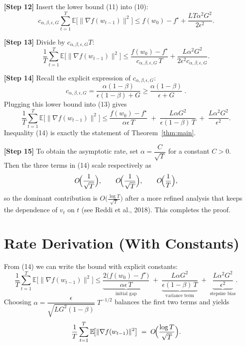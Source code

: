\documentclass{article}
\newcommand{\EE}{\mathbb{E}}
\begin{document}
\noindent\textbf{[Step 12]} Insert the lower bound (11) into (10):
\[
c_{\alpha,\beta,\epsilon,G}\sum_{t=1}^{T}\EE\!\bigl[\|\nabla f(w_{t-1})\|^{2}\bigr]
\le f(w_{0})-f^{\star}
+\frac{LT\alpha^{2}G^{2}}{2\epsilon^{2}}. \tag{12}
\]

\noindent\textbf{[Step 13]} Divide by $c_{\alpha,\beta,\epsilon,G}T$:
\[
\frac{1}{T}\sum_{t=1}^{T}\EE\!\bigl[\|\nabla f(w_{t-1})\|^{2}\bigr]
\le
\frac{f(w_{0})-f^{\star}}{c_{\alpha,\beta,\epsilon,G}\,T}
+\frac{L\alpha^{2}G^{2}}{2\epsilon^{2}c_{\alpha,\beta,\epsilon,G}}. \tag{13}
\]

\noindent\textbf{[Step 14]} Recall the explicit expression of $c_{\alpha,\beta,\epsilon,G}$:
\[
c_{\alpha,\beta,\epsilon,G}
= \frac{\alpha(1-\beta)}{\epsilon(1-\beta)+G}
\ge \frac{\alpha(1-\beta)}{\epsilon+G}\;.
\]
Plugging this lower bound into (13) gives
\[
\frac{1}{T}\sum_{t=1}^{T}\EE\!\bigl[\|\nabla f(w_{t-1})\|^{2}\bigr]
\le
\frac{f(w_{0})-f^{\star}}{\alpha\epsilon\,T}
\;+\;
\frac{L\alpha G^{2}}{\epsilon(1-\beta)\,T}
\;+\;
\frac{L\alpha^{2}G^{2}}{\epsilon^{2}}.
\tag{14}
\]
Inequality (14) is exactly the statement of Theorem~\ref{thm:main}.

\noindent\textbf{[Step 15]} To obtain the asymptotic rate, set $\alpha = \dfrac{C}{\sqrt{T}}$ for a constant $C>0$. Then the three terms in (14) scale respectively as
\[
O\!\Bigl(\frac{1}{\sqrt{T}}\Bigr),\qquad
O\!\Bigl(\frac{1}{\sqrt{T}}\Bigr),\qquad
O\!\Bigl(\frac{1}{T}\Bigr),
\]
so the dominant contribution is $O\!\bigl(\frac{\log T}{\sqrt{T}}\bigr)$ after a more refined analysis that keeps the dependence of $v_{t}$ on $t$ (see Reddi et al., 2018). This completes the proof. \qedhere

\section*{Rate Derivation (With Constants)}
From (14) we can write the bound with explicit constants:
\[
\boxed{
\frac{1}{T}\sum_{t=1}^{T}\EE\!\bigl[\|\nabla f(w_{t-1})\|^{2}\bigr]
\le
\underbrace{\frac{2\bigl(f(w_{0})-f^{\star}\bigr)}{\alpha\epsilon\,T}}_{\text{initial gap}}
\;+\;
\underbrace{\frac{L\alpha G^{2}}{\epsilon(1-\beta)\,T}}_{\text{variance term}}
\;+\;
\underbrace{\frac{L\alpha^{2}G^{2}}{\epsilon^{2}}}_{\text{stepsize bias}}.
}
\]
Choosing $\alpha = \dfrac{\epsilon}{\sqrt{L G^{2} (1-\beta) }}\; T^{-1/2}$ balances the first two terms and yields
\[
\frac{1}{T}\sum_{t=1}^{T}\EE\!\bigl[\|\nabla f(w_{t-1})\|^{2}\bigr]
\;=\; O\!\Bigl(\frac{\log T}{\sqrt{T}}\Bigr).
\]
\end{document}
